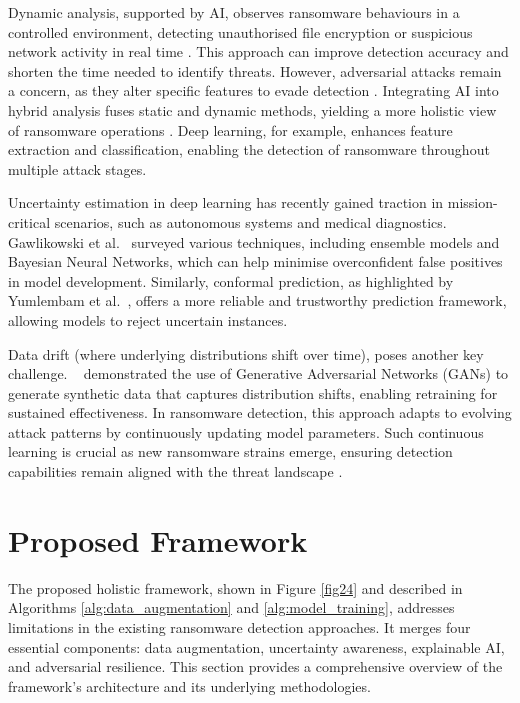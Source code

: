 Dynamic analysis, supported by AI, observes ransomware behaviours in a controlled environment, detecting unauthorised file encryption or suspicious network activity in real time \cite{beaman2021ransomware, amiri2024adventures}. This approach can improve detection accuracy and  shorten the time needed to identify threats. However, adversarial attacks  remain a concern, as they alter specific features to evade detection \cite{yumlembam2024comprehensive}. Integrating AI into hybrid analysis fuses static and dynamic methods, yielding a more holistic view of ransomware operations \cite{razaulla2023age}. Deep learning, for example, enhances feature extraction and classification, enabling the detection of ransomware throughout multiple attack stages.

Uncertainty estimation in deep learning has  recently gained traction in mission-critical scenarios, such as autonomous systems and medical diagnostics. Gawlikowski et al.~\cite{gawlikowski2023Uncertainity} surveyed  various techniques, including ensemble models and Bayesian Neural Networks, which can help minimise overconfident false positives in model development. Similarly, conformal prediction, as highlighted by Yumlembam et al.~\cite{yumlembam2024comprehensive}, offers a more reliable and trustworthy prediction framework, allowing models to reject uncertain instances.

Data drift (where underlying distributions shift over time), poses another key challenge. ~\cite{ashrapov2020tabular} demonstrated the use of Generative Adversarial Networks (GANs) to generate synthetic data that captures distribution shifts, enabling retraining for sustained effectiveness. In ransomware detection, this approach adapts to evolving attack patterns by continuously updating  model parameters. Such continuous learning is crucial as new ransomware strains emerge, ensuring detection capabilities remain aligned with the threat landscape \cite{sarker2020cybersecurity}.

\section{Proposed Framework}
\label{sec:Methodology}

The proposed holistic framework,  shown in Figure \ref{fig24} and  described in
Algorithms \ref{alg:data_augmentation} and \ref{alg:model_training}, addresses limitations in the existing ransomware detection approaches. It merges four essential components: data augmentation, uncertainty awareness, explainable AI, and adversarial resilience. This section provides a comprehensive overview of the framework’s architecture and its underlying methodologies.

